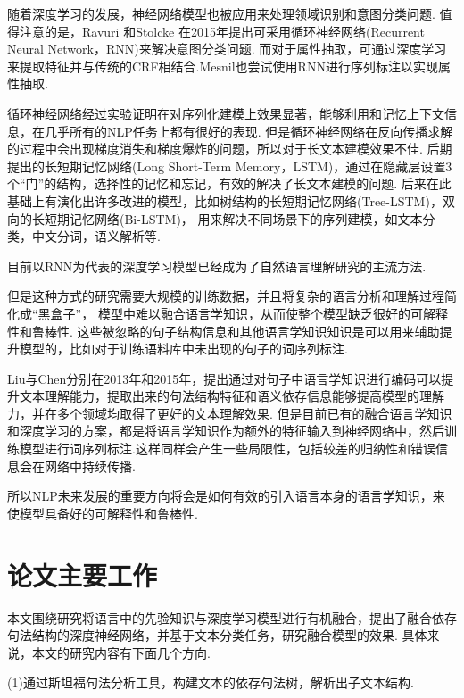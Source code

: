 \documentclass[bachelor,adobefonts]{jnuthesis}
\begin{document}
随着深度学习的发展，神经网络模型也被应用来处理领域识别和意图分类问题.
值得注意的是，Ravuri 和Stolcke 在2015年提出可采用循环神经网络(Recurrent Neural Network，RNN)来解决意图分类问题\cite{Sarikaya2011Deep,Tur2016Towards}.
而对于属性抽取，可通过深度学习来提取特征并与传统的CRF相结合\cite{Xu2014Convolutional}.Mesnil也尝试使用RNN进行序列标注以实现属性抽取\cite{Mesnil2013Investigation}.

循环神经网络经过实验证明在对序列化建模上效果显著，能够利用和记忆上下文信息，在几乎所有的NLP任务上都有很好的表现.
但是循环神经网络在反向传播求解的过程中会出现梯度消失和梯度爆炸的问题，所以对于长文本建模效果不佳.
后期提出的长短期记忆网络\cite{Graves2012Long}(Long Short-Term Memory，LSTM)，通过在隐藏层设置3个“门”的结构，选择性的记忆和忘记，有效的解决了长文本建模的问题.
后来在此基础上有演化出许多改进的模型，比如树结构的长短期记忆网络\cite{Tai2015Improved}(Tree-LSTM)，双向的长短期记忆网络\cite{Bahdanau2014Neural}(Bi-LSTM)，
用来解决不同场景下的序列建模，如文本分类，中文分词，语义解析等.

目前以RNN为代表的深度学习模型已经成为了自然语言理解研究的主流方法.

但是这种方式的研究需要大规模的训练数据，并且将复杂的语言分析和理解过程简化成“黑盒子”，
模型中难以融合语言学知识，从而使整个模型缺乏很好的可解释性和鲁棒性.
这些被忽略的句子结构信息和其他语言学知识知识是可以用来辅助提升模型的，比如对于训练语料库中未出现的句子的词序列标注\cite{Deoras2013Deep}.

Liu与Chen分别在2013年\cite{Liu2014Query}和2015年\cite{Chen2015Matrix}，提出通过对句子中语言学知识进行编码可以提升文本理解能力，提取出来的句法结构特征和语义依存信息能够提高模型的理解力，并在多个领域均取得了更好的文本理解效果.
但是目前已有的融合语言学知识和深度学习的方案，都是将语言学知识作为额外的特征输入到神经网络中，然后训练模型进行词序列标注.这样同样会产生一些局限性，包括较差的归纳性和错误信息会在网络中持续传播.

所以NLP未来发展的重要方向将会是如何有效的引入语言本身的语言学知识，来使模型具备好的可解释性和鲁棒性.

\section{论文主要工作}
本文围绕研究将语言中的先验知识与深度学习模型进行有机融合，提出了融合依存句法结构的深度神经网络，并基于文本分类任务，研究融合模型的效果.
具体来说，本文的研究内容有下面几个方向.

(1)通过斯坦福句法分析工具，构建文本的依存句法树，解析出子文本结构.
\end{document}
